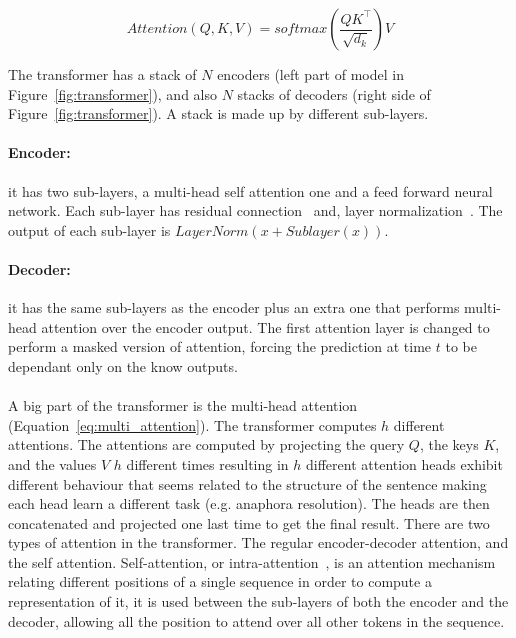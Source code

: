 \begin{equation}
    Attention\left(Q, K, V\right) = softmax\left(\frac{QK^\intercal}{\sqrt{d_k}}\right)V
    \label{eq:dot-attention}
\end{equation}

The transformer has a stack of $N$ encoders (left part of model in Figure~\ref{fig:transformer}), and also $N$ stacks of decoders (right side of Figure~\ref{fig:transformer}). A stack is made up by different sub-layers. 

\paragraph{Encoder:} it has two sub-layers, a multi-head self attention one and a feed forward neural network. Each sub-layer has residual connection~\citep{he2016residual} and, layer normalization~\citep{lei2016normalization}. The output of each sub-layer is $LayerNorm(x + Sublayer(x))$.

\paragraph{Decoder:} it has the same sub-layers as the encoder plus an extra one that performs multi-head attention over the encoder output. The first attention layer is changed to perform a masked version of attention, forcing the prediction at time $t$ to be dependant only on the know outputs.

\paragraph{}
A big part of the transformer is the multi-head attention (Equation~\ref{eq:multi_attention}). The transformer computes $h$ different attentions. The attentions are computed by projecting the query $Q$, the keys $K$, and the values $V$ $h$ different times resulting in $h$ different attention heads exhibit different behaviour that seems related to the structure of the
sentence making each head learn a different task (e.g. anaphora resolution). The heads are then concatenated and projected one last time to get the final result. There are two types of attention in the transformer. The regular encoder-decoder attention, and the self attention. Self-attention, or intra-attention~\citep{cheng-etal-2016-long}, is an attention mechanism relating different positions of a single sequence in order to compute a representation of it, it is used between the sub-layers of both the encoder and the decoder, allowing all the position to attend over all other tokens in the sequence. 

